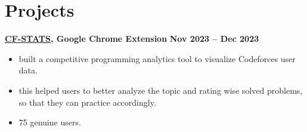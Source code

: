\documentclass[10pt, letterpaper]{article}
\newcommand{\projectEntry}[2]{
  \noindent\textbf{#1} \hfill \textbf{#2}
}
\begin{document}
\section{Projects}

\projectEntry{\href{https://chromewebstore.google.com/detail/cf-stats/ilppbdfnhpcpcbileociilmlajjgacke}{CF-STATS}, Google Chrome Extension}{Nov 2023 -- Dec 2023}
\begin{itemize}[leftmargin=0.2in, nosep, topsep=2pt]
    \item built a competitive programming analytics tool to visualize Codeforces user data.
    \item this helped users to better analyze the topic and rating wise solved problems, so that they can practice accordingly.
    \item 75 genuine users.
\end{itemize}
\vspace{5pt}
\end{document}
